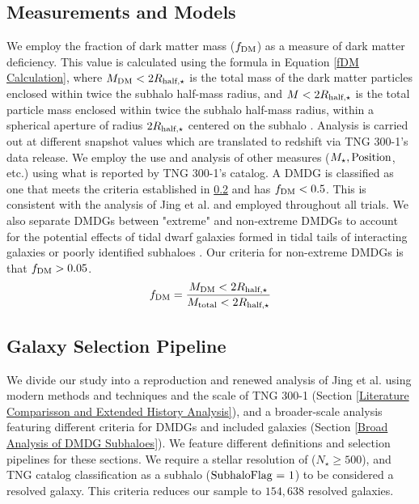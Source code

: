 \documentclass[twocolumn]{openjournal}
\begin{document}
\subsection{Measurements and Models}
\label{Measurements and Models}
We employ the fraction of dark matter mass ($f_\textup{DM}$) as a measure of dark matter deficiency. This value is calculated using the formula in Equation \eqref{fDM Calculation}, where $M_\textup{DM}<2R_{\textup{half}, \star}$ is the total mass of the dark matter particles enclosed within twice the subhalo half-mass radius, and $M<2R_{\textup{half}, \star}$ is the total particle mass enclosed within twice the subhalo half-mass radius, within a spherical aperture of radius $2R_{\textup{half}, \star}$ centered on the subhalo \cite{Jing_2019}. Analysis is carried out at different snapshot values which are translated to redshift via TNG 300-1's data release. We employ the use and analysis of other measures ($M_\star, \textup{Position}$, etc.) using what is reported by TNG 300-1's catalog. A DMDG is classified as one that meets the criteria established in \ref{Galaxy Selection Pipeline} and has $f_\textup{DM} < 0.5$. This is consistent with the analysis of Jing et al. \cite{Jing_2019} and employed throughout all trials. We also separate DMDGs between "extreme" and non-extreme DMDGs to account for the potential effects of tidal dwarf galaxies formed in tidal tails of interacting galaxies or poorly identified subhaloes \cite{2018MNRAS.474..580P}. Our criteria for non-extreme DMDGs is that $f_\textup{DM}>0.05$.  
\begin{equation}
f_\textup{DM} = \frac{M_\textup{DM} < 2R_{\textup{half}, \star}}{M_\textup{total} < 2R_{\textup{half}, \star}}
\label{fDM Calculation}
\end{equation}
\subsection{Galaxy Selection Pipeline}
\label{Galaxy Selection Pipeline}
We divide our study into a reproduction and renewed analysis of Jing et al. \cite{Jing_2019} using modern methods and techniques and the scale of TNG 300-1 (Section \ref{Literature Comparisson and Extended History Analysis}), and a broader-scale analysis featuring different criteria for DMDGs and included galaxies (Section \ref{Broad Analysis of DMDG Subhaloes}). We feature different definitions and selection pipelines for these  sections. We require a stellar resolution of ($N_\star \geq 500$), and TNG catalog classification as a subhalo ($\textup{SubhaloFlag = 1}$) to be considered a resolved galaxy. This criteria reduces our sample to $154,638$ resolved galaxies. 
\end{document}
